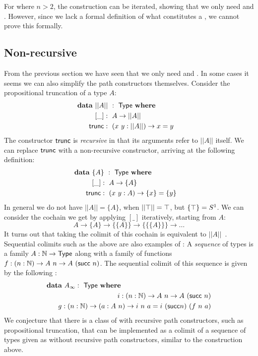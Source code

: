 \documentclass[a4paper,10pt]{report}
\begin{document}
For  where $n > 2$, the construction can be iterated,
showing that we only need \zeroconstructors and
\oneconstructors. However, since we lack a formal definition of what
constitutes a \hit, we cannot prove this formally.

\subsection{Non-recursive \hits}

From the previous section we have seen that we only need
\zeroconstructors and \oneconstructors. In some cases it seems we can
also simplify the path constructors themselves. Consider the
propositional truncation \hit of a type $A$:
%
\begin{alignat*}{2}
  &\rlap{$\data\ || A ||\ :\ \Type\ \where$} \\
  &&\ \ [\_]   &:\ A \to || A || \\
  &&\ \ \trunc &:\ (x\ y : || A ||) \to x = y
\end{alignat*}
%
The constructor $\mathsf{trunc}$ is \emph{recursive} in that its arguments
refer to $|| A ||$ itself. We can replace $\mathsf{trunc}$ with a
non-recursive constructor, arriving at the following definition:
%
\begin{alignat*}{2}
  &\rlap{$\data\ \{ A \}\ :\ \Type\ \where$} \\
  &&\ \ [\_]   &:\ A \to \{ A \} \\
  &&\ \ \trunc &:\ (x\ y : A) \to \{ x \} = \{ y \}
\end{alignat*}
%
In general we do not have $|| A || = \{ A \}$, \eg when
$|| \top || = \top$, but $\{ \top \} = S^1$. We can consider
the cochain we get by applying $[\_]$ iteratively, starting from $A$:
$$
A \to \{ A \} \to \{ \{ A \} \} \to \{ \{ \{ A \} \} \} \to \hdots
$$
It turns out that taking the colimit of this cochain is equivalent to
$|| A ||$~\cite{VanDoorn2015}. Sequential colimits such as the above
are also examples of \hits:
%
A \emph{sequence} of types is a family $A : \mathbb{N} \to \mathsf{Type}$ along with
a family of functions $f : (n : \mathbb{N}) \to A\ n \to A\ (\mathsf{succ}\ n)$. The
sequential colimit of this sequence is given by the following \hit:
%
\begin{alignat*}{2}
  &\rlap{$\data\ A_\infty :\ \Type\ \where$} \\
  &&\ \ i : (n : \Nat) \to A\ n \to A\ (\suc\ n) \\
  &&\ \ g : (n : \Nat) \to (a : A\ n) \to i\ n\ a = i\ (\suc n)\ (f\ n\ a)
\end{alignat*}
%
We conjecture that there is a class of \hits with recursive path
constructors, such as propositional truncation, that can be
implemented as a colimit of a sequence of types given as \hits without
recursive path constructors, similar to the construction above.
\end{document}
